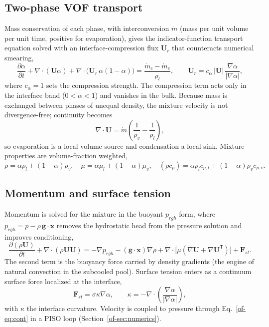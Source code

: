 \documentclass[11pt]{article}
\begin{document}
\subsection{Two-phase VOF transport}
Mass conservation of each phase, with interconversion $\dot m$ (mass per unit volume per
unit time, positive for evaporation), gives the indicator-function transport equation
solved with an interface-compression flux $\mathbf U_r$ that counteracts numerical
smearing,
\begin{equation}
\frac{\partial \alpha}{\partial t}+\nabla\!\cdot(\mathbf{U}\alpha)
+\nabla\!\cdot\!\big(\mathbf{U}_r\,\alpha(1-\alpha)\big)
=\frac{\dot m_c-\dot m_e}{\rho_l},
\qquad
\mathbf U_r=c_\alpha\,|\mathbf U|\,\frac{\nabla\alpha}{|\nabla\alpha|},
\label{of-eq:alpha}
\end{equation}
where $c_\alpha=1$ sets the compression strength. The compression term acts only in the
interface band ($0<\alpha<1$) and vanishes in the bulk. Because mass is exchanged between
phases of unequal density, the mixture velocity is not divergence-free; continuity becomes
\begin{equation}
\nabla\!\cdot\mathbf U=\dot m\!\left(\frac{1}{\rho_v}-\frac{1}{\rho_l}\right),
\label{of-eq:cont}
\end{equation}
so evaporation is a local volume source and condensation a local sink. Mixture properties
are volume-fraction weighted,
\begin{equation}
\rho=\alpha\rho_l+(1-\alpha)\rho_v,\quad
\mu=\alpha\mu_l+(1-\alpha)\mu_v,\quad
(\rho c_p)=\alpha\rho_l c_{p,l}+(1-\alpha)\rho_v c_{p,v}.
\end{equation}

\subsection{Momentum and surface tension}
Momentum is solved for the mixture in the buoyant $p_{rgh}$ form, where
$p_{rgh}=p-\rho\,\mathbf g\!\cdot\!\mathbf x$ removes the hydrostatic head from the
pressure solution and improves conditioning,
\begin{equation}
\frac{\partial(\rho\mathbf U)}{\partial t}+\nabla\!\cdot(\rho\mathbf U\mathbf U)
=-\nabla p_{rgh}-(\mathbf g\!\cdot\!\mathbf x)\nabla\rho
+\nabla\!\cdot\!\big[\mu(\nabla\mathbf U+\nabla\mathbf U^{\mathsf T})\big]
+\mathbf F_{st}.
\label{of-eq:mom}
\end{equation}
The second term is the buoyancy force carried by density gradients (the engine of natural
convection in the subcooled pool). Surface tension enters as a continuum surface force
\cite{of-brackbill1992} localized at the interface,
\begin{equation}
\mathbf F_{st}=\sigma\kappa\nabla\alpha,\qquad
\kappa=-\nabla\!\cdot\!\left(\frac{\nabla\alpha}{|\nabla\alpha|}\right),
\end{equation}
with $\kappa$ the interface curvature. Velocity is coupled to pressure through
Eq.~\eqref{of-eq:cont} in a PISO loop (Section~\ref{of-sec:numerics}).
\end{document}
